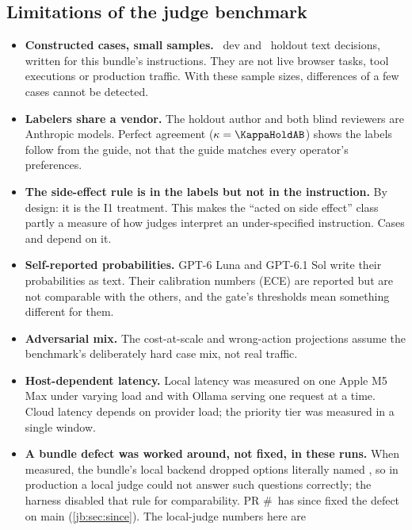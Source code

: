 \subsection{Limitations of the judge benchmark}\label{jb:sec:limits}

\begin{itemize}
  \item \textbf{Constructed cases, small samples.} \DevN\ dev and \HoldN\ holdout text decisions, written
    for this bundle's instructions. They are not live browser tasks, tool executions or production
    traffic. With these sample sizes, differences of a few cases cannot be detected.
  \item \textbf{Labelers share a vendor.} The holdout author and both blind reviewers are Anthropic
    models. Perfect agreement ($\kappa = \KappaHoldAB$) shows the labels follow from the guide, not that
    the guide matches every operator's preferences.
  \item \textbf{The side-effect rule is in the labels but not in the instruction.} By design: it is the
    I1 treatment. This makes the ``acted on side effect'' class partly a measure of how judges interpret
    an under-specified instruction. Cases  and  depend on it.
  \item \textbf{Self-reported probabilities.} GPT-6 Luna and GPT-6.1 Sol write their probabilities as
    text. Their calibration numbers (ECE) are reported but are not comparable with the others, and the
    gate's thresholds mean something different for them.
  \item \textbf{Adversarial mix.} The cost-at-scale and wrong-action projections assume the benchmark's
    deliberately hard case mix, not real traffic.
  \item \textbf{Host-dependent latency.} Local latency was measured on one Apple M5 Max under varying load
    and with Ollama serving one request at a time. Cloud latency depends on provider load; the priority
    tier was measured in a single window.
  \item \textbf{A bundle defect was worked around, not fixed, in these runs.} When measured, the
    bundle's local backend dropped options literally named , so in production a local judge
    could not answer such questions correctly; the harness disabled that rule for comparability. PR
    \#\SincePR\ has since fixed the defect on main (\cref{jb:sec:since}). The local-judge numbers here are

\end{itemize}
